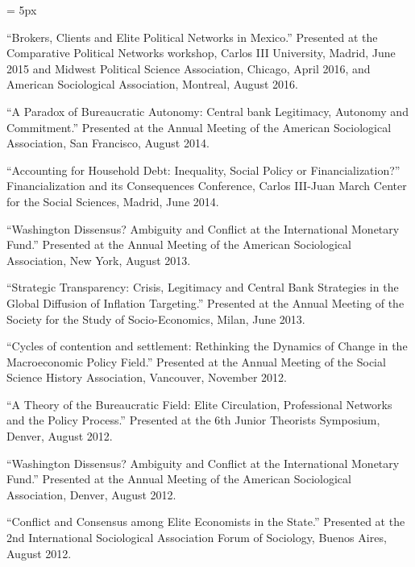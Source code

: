 \documentclass[12pt,letterpaper]{article}
\renewcommand{\labelitemi}{$$}
\begin{document}
\begin{list}{\labelitemi}{\leftmargin = 5px}
\item``Brokers, Clients and Elite Political Networks in Mexico.'' Presented at the Comparative Political Networks workshop, Carlos III University, Madrid, June 2015 and Midwest Political Science Association, Chicago, April 2016, and American Sociological Association, Montreal, August 2016.

\item ``A Paradox of Bureaucratic Autonomy: Central bank Legitimacy, Autonomy and Commitment.'' Presented at the Annual Meeting of the American Sociological Association, San Francisco, August 2014.

\item``Accounting for Household Debt: Inequality, Social Policy or Financialization?'' Financialization and its Consequences Conference, Carlos III-Juan March Center for the Social Sciences, Madrid, June 2014.

\item``Washington Dissensus? Ambiguity and Conflict at the International Monetary Fund.'' Presented at the Annual Meeting of the American Sociological Association, New York, August 2013. 

\item``Strategic Transparency: Crisis, Legitimacy and Central Bank Strategies in the Global Diffusion of Inflation Targeting.'' Presented at the Annual Meeting of the Society for the Study of Socio-Economics, Milan, June 2013.

\item``Cycles of contention and settlement: Rethinking the Dynamics of Change in the Macroeconomic Policy Field.'' Presented at the Annual Meeting of the Social Science History Association, Vancouver, November 2012.

\item``A Theory of the Bureaucratic Field: Elite Circulation, Professional Networks and the Policy Process.'' Presented at the 6th Junior Theorists Symposium, Denver, August 2012.

\item``Washington Dissensus? Ambiguity and Conflict at the International Monetary Fund.'' Presented at the Annual Meeting of the American Sociological Association, Denver, August 2012.

\item``Conflict and Consensus among Elite Economists in the State.'' Presented at the 2nd International Sociological Association Forum of Sociology, Buenos Aires, August 2012.


\end{list}
\end{document}
